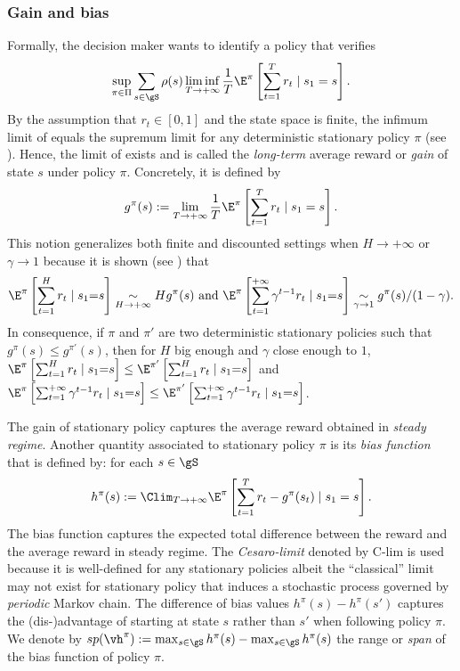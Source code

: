 \subsubsection{Gain and bias}

Formally, the decision maker wants to identify a policy that verifies
\begin{equation}
    \label{eq:avg_obj}
    \sup_{\pi\in\Pi}\sum_{s\in\gS}\rho(s)\liminf_{T\to+\infty}\frac1T \E^\pi\left[ \sum_{t=1}^{T} r_t \mid s_1=s\right].
\end{equation}
By the assumption that $r_t\in[0,1]$ and the state space is finite, the infimum limit of  equals the supremum limit for any deterministic stationary policy $\pi$ (see \cite[Chapter~8]{puterman2014markov}).
Hence, the limit of  exists and is called the \emph{long-term} average reward or \emph{gain} of state $s$ under policy $\pi$.
Concretely, it is defined by
\begin{equation}
    \label{eq:gain_defn}
    g^\pi(s) := \lim_{T\to+\infty}\frac1T \E^\pi\left[ \sum_{t=1}^{T} r_t \mid s_1=s\right].
\end{equation}
This notion generalizes both finite and discounted settings when $H\to+\infty$ or $\gamma\to1$ because it is shown (see \cite[Sections~8.2.1 and 8.2.2]{puterman2014markov}) that 
\begin{align*}
    \E^\pi\left[\sum_{t=1}^H r_t\mid s_1{=}s\right] \underset{H\to+\infty}{\sim} Hg^\pi(s) \text{ and }
    \E^\pi\left[\sum_{t=1}^{+\infty} \gamma^{t-1}r_t \mid s_1{=}s\right] \underset{\gamma\to1}{\sim}
    g^\pi(s)/(1-\gamma).
\end{align*}
In consequence, if $\pi$ and $\pi'$ are two deterministic stationary policies such that $g^\pi(s)\le g^{\pi'}(s)$, then for $H$ big enough and $\gamma$ close enough to $1$, $\E^\pi\left[\sum_{t=1}^H r_t\mid s_1{=}s\right]\le \E^{\pi'}\left[\sum_{t=1}^H r_t\mid s_1{=}s\right]$ and $\E^\pi\left[\sum_{t=1}^{+\infty} \gamma^{t-1}r_t \mid s_1{=}s\right]\le \E^{\pi'}\left[\sum_{t=1}^{+\infty} \gamma^{t-1}r_t \mid s_1{=}s\right]$.

The gain of stationary policy captures the average reward obtained in \emph{steady regime}.
Another quantity associated to stationary policy $\pi$ is its \emph{bias function} that is defined by: for each $s\in\gS$
\begin{equation}
    \label{eq:bias_defn}
    h^\pi(s) :=\Clim_{T\to+\infty} \E^\pi\left[ \sum_{t=1}^{T} r_t -g^\pi(s_t) \mid s_1=s\right].
\end{equation}
The bias function captures the expected total difference between the reward and the average reward in steady regime. 
The \emph{Cesaro-limit} denoted by $\mathrm{C}$-$\mathrm{lim}$ is used because it is well-defined for any stationary policies albeit the ``classical'' limit may not exist for stationary policy that induces a stochastic process governed by \emph{periodic} Markov chain.
The difference of bias values $h^\pi(s)-h^\pi(s')$ captures the (dis-)advantage of starting at state $s$ rather than $s'$ when following policy $\pi$.
We denote by $sp(\vh^\pi):=\max_{s\in\gS}h^\pi(s) -\max_{s\in\gS}h^\pi(s)$ the range or \emph{span} of the bias function of policy $\pi$.

